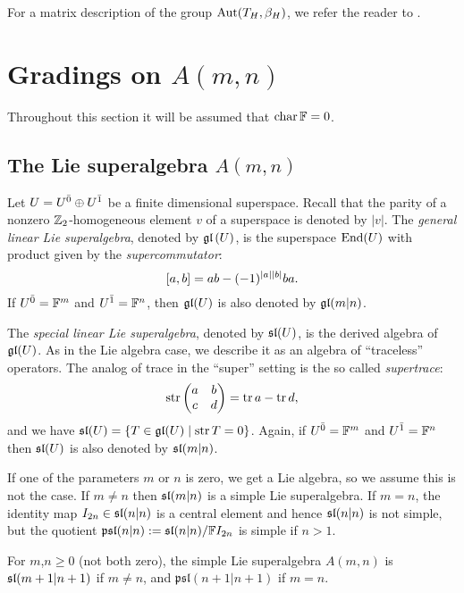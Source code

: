 For a matrix description of the group $\operatorname{Aut}(T_H, \beta_H)$, we refer the reader to \cite[Remark 2.46]{livromicha}.

\section{Gradings on $A(m,n)$}\label{sec:Amn}

Throughout this section it will be assumed that $\operatorname{char} \mathbb{F} = 0$.

\subsection{The Lie superalgebra $A(m,n)$}\label{ssec:def-A}

Let $U = U^{\bar0} \oplus U^{\bar1}$ be a finite dimensional superspace. Recall that the parity of a nonzero $\mathbb{Z}_2$-homogeneous element $v$ of a superspace is denoted by $|v|$. The \emph{general linear Lie superalgebra}, denoted by $\mathfrak{gl}\, (U)$, is the superspace $\operatorname{End}(U)$ with product given by the \emph{supercommutator}: 
\[ 
[a,b] = ab - (-1)^{\mathopen|a\mathclose|\mathopen|b\mathclose|}ba.
\]
If $U^{\bar0}=\mathbb{F}^m$ and $U^{\bar1}=\mathbb{F}^n$, then $\mathfrak{gl} (U)$ is also denoted by $\mathfrak{gl}(m|n)$.

The \emph{special linear Lie superalgebra}, denoted by $\mathfrak{sl} (U)$, is the derived algebra of $\mathfrak{gl}(U)$. As in the Lie algebra case, we describe it as an algebra of ``traceless'' operators. The analog of trace in the ``super'' setting is the so called \emph{supertrace}:%
\[ \operatorname{str} \left(\begin{matrix}
	a  &  b\\
	c  &  d\\
	\end{matrix}\right) = \operatorname{tr} a - \operatorname{tr} d,
\]
and we have $\mathfrak{sl} (U) = \{ T\in \mathfrak{gl} (U) \mid \operatorname{str} T = 0\}$.
Again, if $U^{\bar0}=\mathbb{F}^m$ and $U^{\bar1}=\mathbb{F}^n$ then $\mathfrak{sl} (U)$ is also denoted by $\mathfrak{sl}(m|n)$.

If one of the parameters $m$ or $n$ is zero, we get a Lie algebra, so we assume this is not the case. If $m\neq n$ then $\mathfrak{sl}(m|n)$ is a simple Lie superalgebra. If $m=n$, the identity map $I_{2n}\in \mathfrak{sl}(n|n)$ is a central element and hence $\mathfrak{sl}(n|n)$ is not simple, but the quotient $\mathfrak{psl}(n|n) := \mathfrak{sl}(n|n)/ \mathbb{F} I_{2n}$ is simple if $n>1$.

For $m$,$n\geq 0$ (not both zero), the simple Lie superalgebra $A(m,n)$ is $\mathfrak{sl}(m+1|n+1)$ if $m\neq n$, and $\mathfrak{psl}(n+1|n+1)$ if $m=n$.

